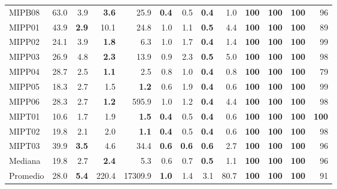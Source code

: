 \begin{table}[!htbp]
{\begin{tabular}{l rrrr | rrrr | rrrr}
MIPB08 & 63.0 & 3.9 & \textbf{3.6} & 25.9 & \textbf{0.4} & 0.5 & \textbf{0.4} & 1.0 & \textbf{100} & \textbf{100} & \textbf{100} & 96 \\
MIPP01 & 43.9 & \textbf{2.9} & 10.1 & 24.8 & 1.0 & 1.1 & \textbf{0.5} & 4.4 & \textbf{100} & \textbf{100} & \textbf{100} & 89 \\
MIPP02 & 24.1 & 3.9 & \textbf{1.8} & 6.3 & 1.0 & 1.7 & \textbf{0.4} & 1.4 & \textbf{100} & \textbf{100} & \textbf{100} & 99 \\
MIPP03 & 26.9 & 4.8 & \textbf{2.3} & 13.9 & 0.9 & 2.3 & \textbf{0.5} & 5.0 & \textbf{100} & \textbf{100} & \textbf{100} & 98 \\
MIPP04 & 28.7 & 2.5 & \textbf{1.1} & 2.5 & 0.8 & 1.0 & \textbf{0.4} & 0.8 & \textbf{100} & \textbf{100} & \textbf{100} & 79 \\
MIPP05 & 18.3 & 2.7 & 1.5 & \textbf{1.2} & 0.6 & 1.9 & \textbf{0.4} & 0.6 & \textbf{100} & \textbf{100} & \textbf{100} & 99 \\
MIPP06 & 28.3 & 2.7 & \textbf{1.2} & 595.9 & 1.0 & 1.2 & \textbf{0.4} & 4.4 & \textbf{100} & \textbf{100} & \textbf{100} & 98 \\
MIPT01 & 10.6 & 1.7 & 1.9 & \textbf{1.5} & \textbf{0.4} & 0.5 & \textbf{0.4} & 0.6 & \textbf{100} & \textbf{100} & \textbf{100} & \textbf{100} \\
MIPT02 & 19.8 & 2.1 & 2.0 & \textbf{1.1} & \textbf{0.4} & 0.5 & \textbf{0.4} & 0.6 & \textbf{100} & \textbf{100} & \textbf{100} & 98 \\
MIPT03 & 39.9 & \textbf{3.5} & 4.6 & 34.4 & \textbf{0.6} & \textbf{0.6} & \textbf{0.6} & 2.7 & \textbf{100} & \textbf{100} & \textbf{100} & 96 \\
\midrule
Mediana & 19.8 & 2.7 & \textbf{2.4} & 5.3 & 0.6 & 0.7 & \textbf{0.5} & 1.1 & \textbf{100} & \textbf{100} & \textbf{100} & 96 \\
Promedio & 28.0 & \textbf{5.4} & 220.4 & 17309.9 & \textbf{1.0} & 1.4 & 3.1 & 80.7 & \textbf{100} & \textbf{100} & \textbf{100} & 91 \\
\bottomrule
\end{tabular}
}
\end{table}

